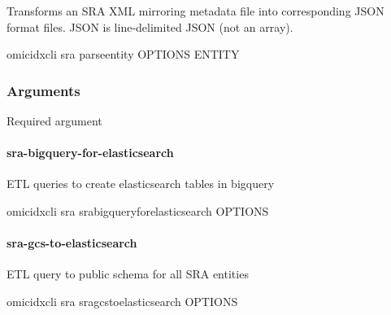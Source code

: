 \documentclass[letterpaper,10pt,english]{sphinxmanual}
\begin{document}
Transforms an SRA XML mirroring metadata file into
corresponding JSON format files. JSON is line-delimited
JSON (not an array).

\begin{sphinxVerbatim}[commandchars=\\\{\}]
omicidx\PYGZhy{}cli sra parse\PYGZhy{}entity \PYG{o}{[}OPTIONS\PYG{o}{]} ENTITY
\end{sphinxVerbatim}
\subsubsection*{Arguments}

\begin{fulllineitems}
\label{\detokenize{cli:cmdoption-omicidx-cli-sra-parse-entity-arg-entity}}
Required argument

\end{fulllineitems}



\paragraph{sra-bigquery-for-elasticsearch}
\label{\detokenize{cli:omicidx-cli-sra-sra-bigquery-for-elasticsearch}}
ETL queries to create elasticsearch tables in bigquery

\begin{sphinxVerbatim}[commandchars=\\\{\}]
omicidx\PYGZhy{}cli sra sra\PYGZhy{}bigquery\PYGZhy{}for\PYGZhy{}elasticsearch \PYG{o}{[}OPTIONS\PYG{o}{]}
\end{sphinxVerbatim}


\paragraph{sra-gcs-to-elasticsearch}
\label{\detokenize{cli:omicidx-cli-sra-sra-gcs-to-elasticsearch}}
ETL query to public schema for all SRA entities

\begin{sphinxVerbatim}[commandchars=\\\{\}]
omicidx\PYGZhy{}cli sra sra\PYGZhy{}gcs\PYGZhy{}to\PYGZhy{}elasticsearch \PYG{o}{[}OPTIONS\PYG{o}{]}
\end{sphinxVerbatim}
\end{document}

